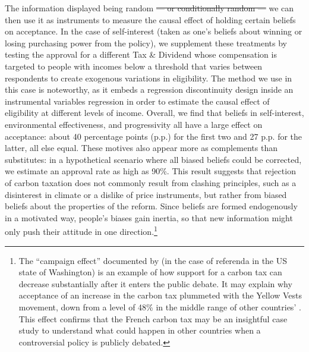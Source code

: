 \documentclass[12pt]{article} %
\providecommand{\DIFdeltex}[1]{{\protect\color{red}\sout{#1}}}                      %
\providecommand{\DIFdelbegin}{} %
\providecommand{\DIFdelend}{} %
\providecommand{\DIFdel}[1]{\texorpdfstring{\DIFdeltex{#1}}{}} %
\newcommand{\DIFscaledelfig}{0.5}
\newlength{\DIFdelgraphicswidth} %
\newlength{\DIFdelgraphicsheight} %
\newcommand{\DIFdelincludegraphics}[2][]{%
\sbox{\DIFdelgraphicsbox}{\DIFOincludegraphics[#1]{#2}}%
\settoboxwidth{\DIFdelgraphicswidth}{\DIFdelgraphicsbox} %
\settoboxtotalheight{\DIFdelgraphicsheight}{\DIFdelgraphicsbox} %
\scalebox{\DIFscaledelfig}{%
\parbox[b]{\DIFdelgraphicswidth}{\usebox{\DIFdelgraphicsbox}\\[-\baselineskip] \rule{\DIFdelgraphicswidth}{0em}}\llap{\resizebox{\DIFdelgraphicswidth}{\DIFdelgraphicsheight}{%
\setlength{\unitlength}{\DIFdelgraphicswidth}%
\begin{picture}(1,1)%
\thicklines\linethickness{2pt} %
{\color[rgb]{1,0,0}\put(0,0){\framebox(1,1){}}}%
{\color[rgb]{1,0,0}\put(0,0){\line( 1,1){1}}}%
{\color[rgb]{1,0,0}\put(0,1){\line(1,-1){1}}}%
\end{picture}%
}\hspace*{3pt}}} %
} %
\DeclareRobustCommand{\DIFdelbegin}{\DIFOdelbegin \let\includegraphics\DIFdelincludegraphics} %
\DeclareRobustCommand{\DIFdelend}{\DIFOaddend \let\includegraphics\DIFOincludegraphics} %
\begin{document}
The information displayed being random \DIFdelbegin \DIFdel{--- or conditionally random --- }\DIFdelend we can then use it as instruments to measure the causal effect of holding certain beliefs on acceptance. In the case of self-interest (taken as one's beliefs about winning or losing purchasing power from the policy), we supplement these treatments by testing the approval for a different Tax \& Dividend whose compensation is targeted to people with incomes below a threshold that varies between respondents to create exogenous variations in eligibility. The method we use in this case is noteworthy, as it embeds a regression discontinuity design inside an instrumental variables regression in order to estimate the causal effect of eligibility at different levels of income. Overall, we find that beliefs in self-interest, environmental effectiveness, and progressivity all have a large effect on acceptance: about 40 percentage points (p.p.) for the first two and 27 p.p. for the latter, all else equal. These motives also appear more as complements than substitutes: in a hypothetical scenario where all biased beliefs could be corrected, we estimate an approval rate as high as 90\%. This result suggests that rejection of carbon taxation does not commonly result from clashing principles, such as a disinterest in climate or a dislike of price instruments, but rather from biased beliefs about the properties of the reform. Since beliefs are formed endogenously in a motivated way, people's biases gain inertia, so that new information might only push their attitude in one direction.\footnote{The ``campaign effect'' documented by \citet{anderson_can_2019} (in the case of referenda in the US state of Washington) is an example of how support for a carbon tax can decrease substantially after it enters the public debate. It may explain why acceptance of an increase in the carbon tax plummeted with the Yellow Vests movement, down from a level of 48\% \citep{ademe_representations_2018} in the middle range of other countries' \citep{brechin_public_2010}. This effect confirms that the French carbon tax may be an insightful case study to understand what could happen in other countries when a controversial policy is publicly debated.} %
\end{document}
